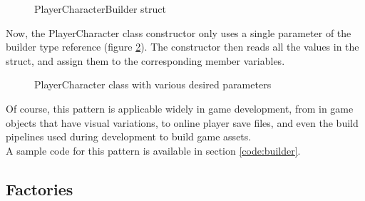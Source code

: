 \documentclass[10pt,letterpaper]{article}
\newcommand{\bs}{\bigskip}
\begin{document}
\begin{multicols}{2}
\begin{figure}[H]
	\centering


	\caption{PlayerCharacterBuilder struct}
	\label{fig:playercharacter-builder}
\end{figure}

Now, the PlayerCharacter class constructor only uses a single parameter of the builder type reference (figure \ref{fig:playercharacter-2}). The constructor then reads all the values in the struct, and assign them to the corresponding member variables.

\begin{figure}[H]
	\centering


	\caption{PlayerCharacter class with various desired parameters}
	\label{fig:playercharacter-2}
\end{figure}

Of course, this pattern is applicable widely in game development, from in game objects that have visual variations, to online player save files, and even the build pipelines used during development to build game assets.\bs
\\
A sample code for this pattern is available in section \ref{code:builder}.

\subsection{Factories}


\end{multicols}
\end{document}
